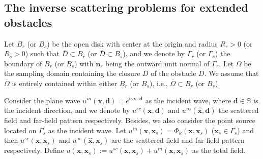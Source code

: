\documentclass[10pt,a4paper]{article}
\numberwithin{equation}{section}
\begin{document}
\subsection{The inverse scattering problems for extended obstacles}

Let $B_r$ (or $B_s$) be the open disk with center at the origin and radius $R_r>0$ (or $R_s>0$)  such that $\overline{D}\subset B_r$ (or $\overline{D}\subset B_s$), and we denote by $\Gamma_r$ (or $\Gamma_s$) the boundary of  $B_r$ (or $B_s$) with $\bm{ n }_r$ being the outward unit normal of $\Gamma_r$. Let $\Omega$ be the sampling domain containing the closure  $\overline{D}$ of the obstacle $D$. We assume that $\overline{\Omega}$ is entirely contained within either $B_r$ (or $B_s$), i.e., $\overline{\Omega}\subset B_r$ (or $B_s$).

Consider the plane wave $u^{in}(\bm{ x }, \bm{ d })=e^{\mathrm{ i } \kappa \bm{ x }\cdot \bm{ d }}$ as the incident wave, where $\bm{ d }\in \mathbb{S}$ is the incident direction, and we denote by $u^{sc}(\bm{ x }, \bm{ d })$ and $u^{\infty}(\hat{\bm  x }, \bm{ d })$ the scattered field and far-field pattern respectively. Besides, we also consider the point source located on $\Gamma_s$ as the incident wave. Let  $u^{in}(\bm{ x },\bm{ x }_s)=\Phi_{\kappa}(\bm{ x },\bm{ x }_s)$ ($\bm{ x }_s \in \Gamma_{s}$) and then  $u^{sc}(\bm{ x }, \bm{ x }_s)$ and $u^{\infty}(\hat{\bm  x }, \bm{ x }_s)$ are the scattered field and far-field pattern respectively.
 Define $u(\bm{ x }, \bm{ x }_s):= u^{sc}(\bm{ x }, \bm{ x }_s)+u^{in}(\bm{ x }, \bm{ x }_s)$ as the total field.
\end{document}
